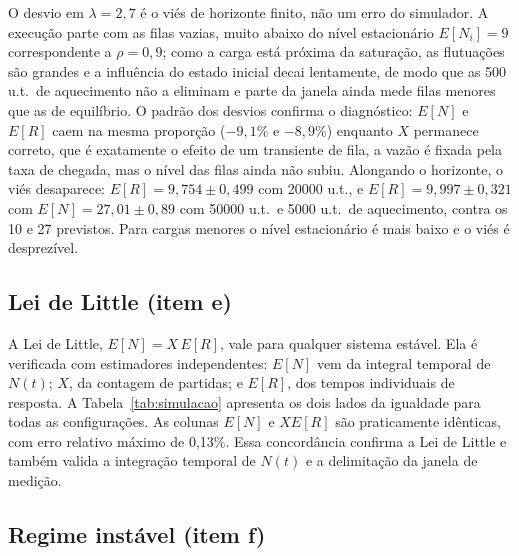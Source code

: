 \documentclass[conference,a4paper]{IEEEtran}
\begin{document}
O desvio em $\lambda=2{,}7$ é o viés de horizonte finito, não um erro do simulador. A execução parte com as filas vazias, muito abaixo do nível estacionário $E[N_i]=9$ correspondente a $\rho=0{,}9$; como a carga está próxima da saturação, as flutuações são grandes e a influência do estado inicial decai lentamente, de modo que as 500 u.t.\ de aquecimento não a eliminam e parte da janela ainda mede filas menores que as de equilíbrio. O padrão dos desvios confirma o diagnóstico: $E[N]$ e $E[R]$ caem na mesma proporção ($-9{,}1$\% e $-8{,}9$\%) enquanto $X$ permanece correto, que é exatamente o efeito de um transiente de fila, a vazão é fixada pela taxa de chegada, mas o nível das filas ainda não subiu. Alongando o horizonte, o viés desaparece: $E[R]=9{,}754\pm0{,}499$ com 20000 u.t., e $E[R]=9{,}997\pm0{,}321$ com $E[N]=27{,}01\pm0{,}89$ com 50000 u.t.\ e 5000 u.t.\ de aquecimento, contra os 10 e 27 previstos. Para cargas menores o nível estacionário é mais baixo e o viés é desprezível. 

\subsection{Lei de Little (item e)}

A Lei de Little, $E[N]=X\,E[R]$, vale para qualquer sistema estável. Ela é
verificada com estimadores independentes: $E[N]$ vem da integral temporal de
$N(t)$; $X$, da contagem de partidas; e $E[R]$, dos tempos individuais de
resposta. A Tabela~\ref{tab:simulacao} apresenta os dois lados da igualdade
para todas as configurações. As colunas $E[N]$ e $X E[R]$ são praticamente
idênticas, com erro relativo máximo de 0,13\%. Essa concordância confirma a
Lei de Little e também valida a integração temporal de $N(t)$ e a delimitação
da janela de medição.

\subsection{Regime instável (item f)}
\end{document}
